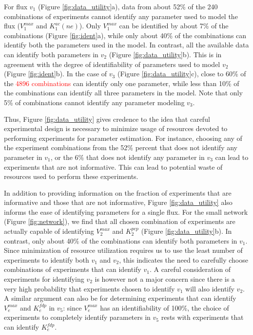\documentclass[10pt]{article}
\begin{document}
	For flux $v_1$ (Figure \ref{fig:data_utility}a), data from about 52\% of the 240 combinations of experiments cannot identify any parameter used to model the flux ($V_1^{max}$ and $K_1^{ac}(ne)$). Only $V_1^{max}$ can be identified by about 7\% of the combinations (Figure \ref{fig:ident}a), while only about 40\% of the combinations can identify both the parameters used in the model. 	
	In contrast, all the available data can identify both parameters in $v_2$ (Figure \ref{fig:data_utility}b). This is in agreement with the degree of identifiability of parameters used to model $v_2$ (Figure \ref{fig:ident}b). In the case of $v_3$ (Figure \ref{fig:data_utility}c), close to 60\% of the \textcolor{red}{4896 combinations} can identify only one parameter, while less than 10\% of the combinations can identify all three parameters in the model. Note that only 5\% of combinations cannot identify any parameter modeling $v_3$. 
	
	Thus, Figure \ref{fig:data_utility} gives credence to the idea that careful experimental design is necessary to minimize usage of resources devoted to performing experiments for parameter estimation. For instance, choosing any of the experiment combinations from the 52\% percent that does not identify any parameter in $v_1$, or the 6\% that does not identify any parameter in $v_3$ can lead to experiments that are not informative. This can lead to potential waste of resources used to perform these experiments.	 
	
	In addition to providing information on the fraction of experiments that are informative and those that are not informative, Figure \ref{fig:data_utility} also informs the ease of identifying parameters for a single flux. For the small network (Figure \ref{fig:network}), we find that all chosen combination of experiments are actually capable of identifying $V_2^{max}$ and $K_2^{pep}$ (Figure \ref{fig:data_utility}b). In contrast, only about 40\% of the combinations can identify both parameters in $v_1$. Since minimization of resource utilization requires us to use the least number of experiments to identify both $v_1$ and $v_2$, this indicates the need to carefully choose combinations of experiments that can identify $v_1$. A careful consideration of experiments for identifying $v_2$ is however not a major concern since there is a very high probability that experiments chosen to identify $v_1$ will also identify $v_2$. A similar argument can also be for determining experiments that can identify $V_e^{max}$ and $K_e^{fdp}$ in $v_5$: since $V_e^{max}$ has an identifiability of 100\%, the choice of experiments to completely identify parameters in $v_5$ rests with experiments that can identify $K_e^{fdp}$.
	
\end{document}
